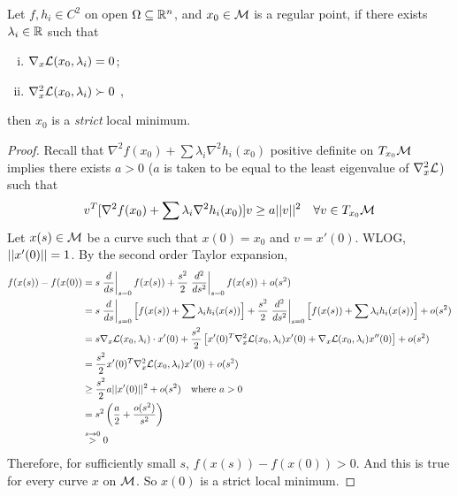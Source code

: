 \documentclass{article}
\begin{document}
   	\begin{theorem}
   		Let $f, h_i \in C^2$ on open $\Omega \subseteq \mathbb{R}^n$, and $x_0 \in \mathcal{{M}}$ is a regular point, if there exists $\lambda_i \in \mathbb{R}$ such that
   		\begin{enumerate}[(i)]
   			\item $\nabla_x \mathcal{{L}}(x_0, \lambda_i) = 0$;
   			\item $\nabla_x^2 \mathcal{{L}}(x_0, \lambda_i) \succ 0$ ,
   		\end{enumerate}
   		then $x_0$ is a \emph{strict} local minimum.
   	\end{theorem}
   	\begin{proof}
   		Recall that $\nabla^2 f(x_0) + \sum \lambda_i \nabla^2 h_i(x_0)$ positive definite on $T_{x_0} \mathcal{{M}}$ implies there exists $a > 0$ ($a$ is taken to be equal to the least eigenvalue of $\nabla^2_x \mathcal{{L}}$) such that 
   		\begin{align}
   			v^T [\nabla^2 f(x_0) + \sum \lambda_i \nabla^2 h_i(x_0)] v \geq a \vert \vert {v} \vert \vert^2\quad \forall v \in T_{x_0} \mathcal{{M}}
   		\end{align}
   		Let $x(s) \in \mathcal{{M}}$ be a curve such that $x(0) = x_0$ and $v = x'(0)$. WLOG, $\vert \vert {x'(0)} \vert \vert = 1$. By the second order Taylor expansion,
   		\begin{align}
   			f(x(s)) - f(x(0)) &= s \left. \frac{d}{ds} \right\vert_{s=0} f(x(s)) + \frac{s^2}{2} \left. \frac{d^2}{ds^2} \right\vert_{s=0} f(x(s)) + o(s^2) \\
   			&= s \left. \frac{d}{ds} \right\vert_{s=0} \left[f(x(s)) + \sum \lambda_i h_i(x(s))\right] + \frac{s^2}{2} \left. \frac{d^2}{ds^2} \right\vert_{s=0} \left[f(x(s)) + \sum \lambda_i h_i(x(s))\right] + o(s^2) \\
   			&= s \nabla_x \mathcal{{L}}(x_0, \lambda_i) \cdot x'(0)
   			+ \frac{s^2}{2}
   			\left[x'(0)^T \nabla_x^2 \mathcal{{L}}(x_0, \lambda_i) x'(0) + \nabla_x \mathcal{{L}}(x_0, \lambda_i) x''(0) \right]
   			+ o(s^2) \\
   			&= \frac{s^2}{2} x'(0)^T \nabla_x^2 \mathcal{{L}}(x_0, \lambda_i) x'(0) + o(s^2) \\
   			&\geq \frac{s^2}{2} a \vert \vert {x'(0)} \vert \vert^2 + o(s^2)\quad \text{{where }} a > 0 \\
   			&= s^2 \left(\frac{a}{2} + \frac{o(s^2)}{s^2}\right) \\
   			&\overset{s \to 0}{>} 0
   		\end{align}
   		Therefore, for sufficiently small $s$, $f(x(s)) - f(x(0)) > 0$. And this is true for every curve $x$ on $\mathcal{{M}}$. So $x(0)$ is a strict local minimum.
   	\end{proof}
   	
\end{document}
